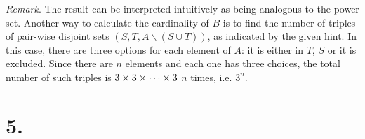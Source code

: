 \documentclass[12pt]{article}
\newenvironment{ps}
{\begin{enumerate}[leftmargin=0em, itemindent=1.5em]}
{\end{enumerate}}
\begin{document}
\begin{ps}
    \textit{Remark}. The result can be interpreted intuitively as being analogous to the power set.
    Another way to calculate the cardinality of \( B \) is to find the number of triples of
    pair-wise disjoint sets \( (S, T, A \backslash (S \cup T)) \), as indicated by the given hint. In this case,
    there are three options for each element of \( A \): it is either in \( T \), \( S \) or it is
    excluded. Since there are \( n \) elements and each one has three choices, the total number of
    such triples is \( 3 \times 3 \time 3 \times \dots \times 3 \) \( n \) times, i.e. \( 3^n \).

\end{ps}


\section*{5.}
\end{document}
